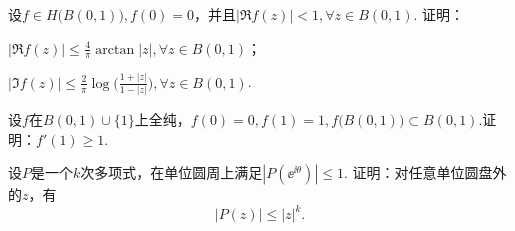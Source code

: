 \begin{xiti}
\item 设$f\in H\big(B(0,1)\big),f(0)=0$，并且$|\Re f(z)|<1,\forall z\in B(0,1)$. 证明：
\begin{enuma}
  \item $|\Re f(z)|\le\frac4\pi\arctan|z|,\forall z\in B(0,1)$；
  \item $|\Im f(z)|\le\frac2\pi\log\bigg(\frac{1+|z|}{1-|z|}\bigg),\forall z\in B(0,1)$.
\end{enuma}
\item 设$f$在$B(0,1)\cup\{1\}$上全纯，$f(0)=0,f(1)=1,f\big(B(0,1)\big)\subset B(0,1)$.证明：$f'(1)\ge1$.
\item 设$P$是一个$k$次多项式，在单位圆周上满足$|P(\ee^{\ii\theta})|\le1$. 证明：对任意单位圆盘外的$z$，有
    \[|P(z)|\le |z|^k.\]
\end{xiti}
